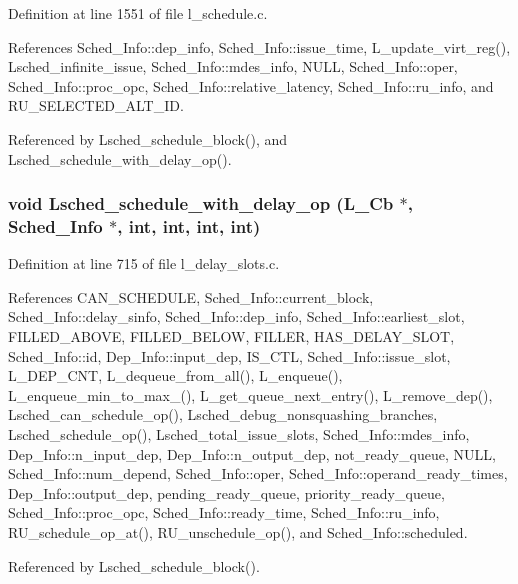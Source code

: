 Definition at line 1551 of file l\_\-schedule.c.

References Sched\_\-Info::dep\_\-info, Sched\_\-Info::issue\_\-time, L\_\-update\_\-virt\_\-reg(), Lsched\_\-infinite\_\-issue, Sched\_\-Info::mdes\_\-info, NULL, Sched\_\-Info::oper, Sched\_\-Info::proc\_\-opc, Sched\_\-Info::relative\_\-latency, Sched\_\-Info::ru\_\-info, and RU\_\-SELECTED\_\-ALT\_\-ID.

Referenced by Lsched\_\-schedule\_\-block(), and Lsched\_\-schedule\_\-with\_\-delay\_\-op().
\subsubsection{\setlength{\rightskip}{0pt plus 5cm}void Lsched\_\-schedule\_\-with\_\-delay\_\-op (L\_\-Cb $\ast$, \bf{Sched\_\-Info} $\ast$, int, int, int, int)}\label{l__schedule_8h_cda824c560796f56f032cea6a184ad23}




Definition at line 715 of file l\_\-delay\_\-slots.c.

References CAN\_\-SCHEDULE, Sched\_\-Info::current\_\-block, Sched\_\-Info::delay\_\-sinfo, Sched\_\-Info::dep\_\-info, Sched\_\-Info::earliest\_\-slot, FILLED\_\-ABOVE, FILLED\_\-BELOW, FILLER, HAS\_\-DELAY\_\-SLOT, Sched\_\-Info::id, Dep\_\-Info::input\_\-dep, IS\_\-CTL, Sched\_\-Info::issue\_\-slot, L\_\-DEP\_\-CNT, L\_\-dequeue\_\-from\_\-all(), L\_\-enqueue(), L\_\-enqueue\_\-min\_\-to\_\-max\_(), L\_\-get\_\-queue\_\-next\_\-entry(), L\_\-remove\_\-dep(), Lsched\_\-can\_\-schedule\_\-op(), Lsched\_\-debug\_\-nonsquashing\_\-branches, Lsched\_\-schedule\_\-op(), Lsched\_\-total\_\-issue\_\-slots, Sched\_\-Info::mdes\_\-info, Dep\_\-Info::n\_\-input\_\-dep, Dep\_\-Info::n\_\-output\_\-dep, not\_\-ready\_\-queue, NULL, Sched\_\-Info::num\_\-depend, Sched\_\-Info::oper, Sched\_\-Info::operand\_\-ready\_\-times, Dep\_\-Info::output\_\-dep, pending\_\-ready\_\-queue, priority\_\-ready\_\-queue, Sched\_\-Info::proc\_\-opc, Sched\_\-Info::ready\_\-time, Sched\_\-Info::ru\_\-info, RU\_\-schedule\_\-op\_\-at(), RU\_\-unschedule\_\-op(), and Sched\_\-Info::scheduled.

Referenced by Lsched\_\-schedule\_\-block().
